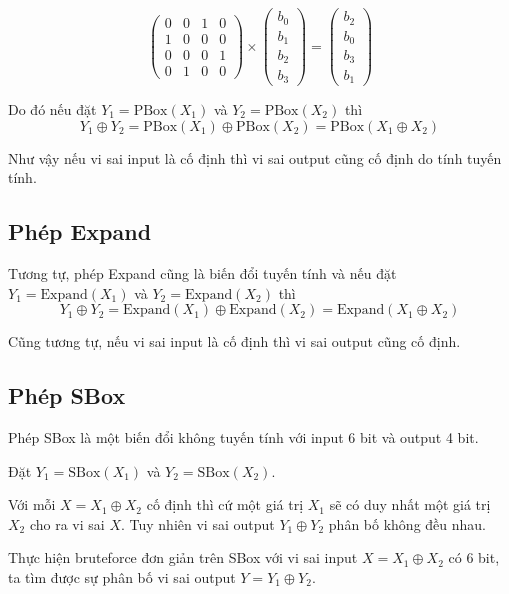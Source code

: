 \documentclass{article}
\newcommand{\PBox}{\text{PBox}}
\newcommand{\SBox}{\text{SBox}}
\newcommand{\Expand}{\text{Expand}}
\begin{document}
\[
    \begin{pmatrix}
        0 & 0 & 1 & 0 \\
        1 & 0 & 0 & 0 \\
        0 & 0 & 0 & 1 \\
        0 & 1 & 0 & 0
    \end{pmatrix} \times
    \begin{pmatrix}
        b_0 \\ b_1 \\ b_2 \\ b_3
    \end{pmatrix} =
    \begin{pmatrix}
        b_2 \\ b_0 \\ b_3 \\ b_1
    \end{pmatrix}
\]

Do đó nếu đặt $Y_1 = \PBox (X_1)$ và $Y_2 = \PBox (X_2)$
thì \[Y_1 \oplus Y_2 = \PBox(X_1) \oplus \PBox(X_2) = \PBox(X_1 \oplus X_2)\]

Như vậy nếu vi sai input là cố định thì vi sai output cũng cố định do tính tuyến 
tính.

\subsection{Phép Expand}

Tương tự, phép Expand cũng là biến đổi tuyến tính và nếu đặt $Y_1 = \Expand(X_1)$
và $Y_2 = \Expand(X_2)$ thì \[Y_1 \oplus Y_2 = \Expand(X_1) \oplus \Expand(X_2)
= \Expand(X_1 \oplus X_2)\]

Cũng tương tự, nếu vi sai input là cố định thì vi sai output cũng cố định.

\subsection{Phép SBox}

Phép SBox là một biến đổi không tuyến tính với input 6 bit và output 4 bit.

Đặt $Y_1 = \SBox(X_1)$ và $Y_2 = \SBox(X_2)$.

Với mỗi $X = X_1 \oplus X_2$ cố định thì cứ một giá trị $X_1$ sẽ có duy nhất
một giá trị $X_2$ cho ra vi sai $X$. Tuy nhiên vi sai output $Y_1 \oplus Y_2$
phân bố không đều nhau.

Thực hiện bruteforce đơn giản trên SBox với vi sai input $X = X_1 \oplus X_2$ 
có 6 bit, ta tìm được sự phân bố vi sai output $Y = Y_1 \oplus Y_2$.
\end{document}
